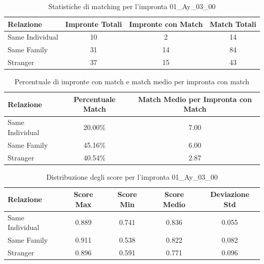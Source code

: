 \begin{table}[htbp]
\centering
\caption{Statistiche di matching per l'impronta 01\_Ay\_03\_00}
\label{tab:results_01_Ay_03_00}
\begin{tabular}{|l|c|c|c|}
\hline
\textbf{Relazione} & \textbf{Impronte Totali} & \textbf{Impronte con Match} & \textbf{Match Totali} \\
\hline
Same Individual & 10 & 2 & 14 \\
\hline
Same Family & 31 & 14 & 84 \\
\hline
Stranger & 37 & 15 & 43 \\
\hline
\end{tabular}
\end{table}


\begin{table}[htbp]
\centering
\caption{Percentuale di impronte con match e match medio per impronta con match}
\label{tab:match_percentage_01_Ay_03_00}
\begin{tabular}{|l|c|c|}
\hline
\textbf{Relazione} & \textbf{Percentuale Match} & \textbf{Match Medio per Impronta con Match} \\
\hline
Same Individual & 20.00\% & 7.00 \\
\hline
Same Family & 45.16\% & 6.00 \\
\hline
Stranger & 40.54\% & 2.87 \\
\hline
\end{tabular}
\end{table}


\begin{table}[htbp]
\centering
\caption{Distribuzione degli score per l'impronta 01\_Ay\_03\_00}
\label{tab:scores_01_Ay_03_00}
\begin{tabular}{|l|c|c|c|c|}
\hline
\textbf{Relazione} & \textbf{Score Max} & \textbf{Score Min} & \textbf{Score Medio} & \textbf{Deviazione Std} \\
\hline
Same Individual & 0.889 & 0.741 & 0.836 & 0.055 \\
\hline
Same Family & 0.911 & 0.538 & 0.822 & 0.082 \\
\hline
Stranger & 0.896 & 0.591 & 0.771 & 0.096 \\
\hline
\end{tabular}
\end{table}

